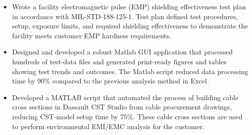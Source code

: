 \documentclass[letterpaper,12pt]{article}
\newcommand{\simpleParagraph}[1]{
    \vspace{-1pt}
    \begin{adjustwidth}{7pt}{0pt}
        #1
    \end{adjustwidth}
}
\newcommand{\matlab}[0]{
    Matlab
}
\begin{document}
    \simpleParagraph{
        \begin{itemize}
            \item Wrote a facility electromagnetic pulse (EMP) shielding effectiveness test plan in
                accordance with MIL-STD-188-125-1. Test plan defined test procedures, setup, exposure
                limits, and required shielding effectiveness to demonstrate the facility meets customer 
                EMP hardness requirements.


            \item Designed and developed a robust \matlab GUI application that processed hundreds
                of test-data files and generated print-ready figures and tables showing test trends and outcomes.
                The \matlab script reduced data processing time by 90\% compared to the previous analysis 
                method in Excel.

            \item Developed a MATLAB script that automated the process of building cable cross sections
                in Dassault CST Studio from cable procurement drawings, reducing CST-model setup time by 75\%.
                These cable cross sections are used to perform environmental EMI/EMC analysis for the 
                customer.



        \end{itemize}
    }
\end{document}
